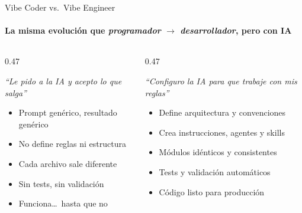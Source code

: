 \documentclass[aspectratio=169,11pt]{beamer}
\begin{document}
\begin{frame}{Vibe Coder vs.\ Vibe Engineer}
  \framesubtitle{La misma evoluci\'on que \textit{programador} \(\to\) \textit{desarrollador}, pero con IA}

  \begin{columns}[T]
    \begin{column}{0.47\textwidth}
      \begin{tcolorbox}[colback=ixtiLightGray!10, colframe=ixtiLightGray, title={\faCode\ Vibe Coder}, fonttitle=\small\bfseries, coltitle=ixtiDark, top=2pt, bottom=2pt]
        \small
        \textit{``Le pido a la IA y acepto lo que salga''}
        \vspace{0.2em}
        \begin{itemize}\setlength{\itemsep}{0pt}
          \item[\textcolor{ixtiLightGray}{\faAngleRight}] Prompt gen\'erico, resultado gen\'erico
          \item[\textcolor{ixtiLightGray}{\faAngleRight}] No define reglas ni estructura
          \item[\textcolor{ixtiLightGray}{\faAngleRight}] Cada archivo sale diferente
          \item[\textcolor{ixtiLightGray}{\faAngleRight}] Sin tests, sin validaci\'on
          \item[\textcolor{ixtiLightGray}{\faAngleRight}] Funciona\ldots\ hasta que no
        \end{itemize}
      \end{tcolorbox}
    \end{column}
    \begin{column}{0.47\textwidth}
      \begin{tcolorbox}[colback=ixtiGreen!5, colframe=ixtiTeal, title={\faCogs\ Vibe Engineer}, fonttitle=\small\bfseries, coltitle=white, top=2pt, bottom=2pt]
        \small
        \textit{``Configuro la IA para que trabaje con mis reglas''}
        \vspace{0.2em}
        \begin{itemize}\setlength{\itemsep}{0pt}
          \item[\textcolor{ixtiGreen}{\faAngleRight}] Define arquitectura y convenciones
          \item[\textcolor{ixtiGreen}{\faAngleRight}] Crea instrucciones, agentes y skills
          \item[\textcolor{ixtiGreen}{\faAngleRight}] M\'odulos id\'enticos y consistentes
          \item[\textcolor{ixtiGreen}{\faAngleRight}] Tests y validaci\'on autom\'aticos
          \item[\textcolor{ixtiGreen}{\faAngleRight}] C\'odigo listo para producci\'on
        \end{itemize}
      \end{tcolorbox}
    \end{column}
  \end{columns}


\end{frame}
\end{document}
